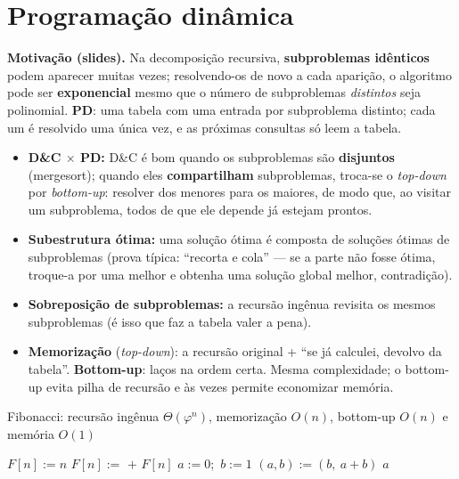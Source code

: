 \section{Programação dinâmica}\label{sec:pd}
\textbf{Motivação (slides).} Na decomposição recursiva, \textbf{subproblemas idênticos} podem aparecer muitas vezes; resolvendo-os de novo a cada aparição, o algoritmo pode ser \textbf{exponencial} mesmo que o número de subproblemas \emph{distintos} seja polinomial. \textbf{PD}: uma tabela com uma entrada por subproblema distinto; cada um é resolvido uma única vez, e as próximas consultas só leem a tabela.
\begin{itemize}
  \item \textbf{D\&C $\times$ PD:} D\&C é bom quando os subproblemas são \textbf{disjuntos} (mergesort); quando eles \textbf{compartilham} subproblemas, troca-se o \emph{top-down} por \emph{bottom-up}: resolver dos menores para os maiores, de modo que, ao visitar um subproblema, todos de que ele depende já estejam prontos.
  \item \textbf{Subestrutura ótima:} uma solução ótima é composta de soluções ótimas de subproblemas (prova típica: ``recorta e cola'' --- se a parte não fosse ótima, troque-a por uma melhor e obtenha uma solução global melhor, contradição).
  \item \textbf{Sobreposição de subproblemas:} a recursão ingênua revisita os mesmos subproblemas (é isso que faz a tabela valer a pena).
  \item \textbf{Memorização} (\emph{top-down}): a recursão original + ``se já calculei, devolvo da tabela''. \textbf{Bottom-up}: laços na ordem certa. Mesma complexidade; o bottom-up evita pilha de recursão e às vezes permite economizar memória.
\end{itemize}

\begin{pseudo}{Fibonacci: recursão ingênua $\Theta(\varphi^n)$, memorização $O(n)$, bottom-up $O(n)$ e memória $O(1)$}
\begin{algorithmic}
 
     \State $F[n]:=n$ \Else \State $F[n]:=$  $+$  \EndIf
  \EndIf
  \State \Return $F[n]$
\EndFunction
{}
  \State $a:=0$;\ $b:=1$ 
   \State $(a,b):=(b,\ a+b)$ \EndFor
  \State \Return $a$
\EndFunction
\end{algorithmic}
\end{pseudo}

